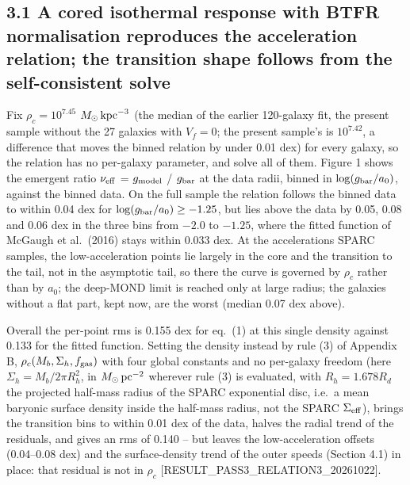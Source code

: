 \documentclass[
  10pt,
]{article}
\begin{document}
\subsection{3.1 A cored isothermal response with BTFR normalisation reproduces the acceleration relation; the transition shape follows from the self-consistent solve}\label{a-cored-isothermal-response-with-btfr-normalisation-reproduces-the-acceleration-relation-the-transition-shape-is-the-output}

Fix $\rho_c=10^{7.45}$ $M_\odot\,{\rm kpc}^{-3}$ (the median of the earlier 120-galaxy fit, the present sample without the 27 galaxies with $V_f=0$; the present sample's is $10^{7.42}$, a difference that moves the binned relation by under 0.01 dex) for every galaxy, so the relation has no per-galaxy parameter, and solve all of them. Figure 1 shows the emergent ratio $\nu_{\rm eff}$ = $g_{\rm model}$ / $g_{\rm bar}$ at the data radii, binned in $\log(g_{\rm bar}/a_0)$, against the binned data. On the full sample the relation follows the binned data to within 0.04 dex for $\log(g_{\rm bar}/a_0)\ge-1.25$, but lies above the data by 0.05, 0.08 and 0.06 dex in the three bins from $-2.0$ to $-1.25$, where the fitted function of McGaugh et al.~(2016) stays within 0.033 dex. At the accelerations SPARC samples, the low-acceleration points lie largely in the core and the transition to the tail, not in the asymptotic tail, so there the curve is governed by $\rho_c$ rather than by $a_0$; the deep-MOND limit is reached only at large radius; the galaxies without a flat part, kept now, are the worst (median 0.07 dex above).

Overall the per-point rms is 0.155 dex for eq.~(1) at this single density against 0.133 for the fitted function. Setting the density instead by rule (3) of Appendix B, $\rho_c(M_b,\Sigma_h,f_{\rm gas})$ with four global constants and no per-galaxy freedom (here $\Sigma_h=M_b/2\pi R_h^2$, in $M_\odot\,{\rm pc}^{-2}$ wherever rule (3) is evaluated, with $R_h=1.678R_d$ the projected half-mass radius of the SPARC exponential disc, i.e.\ a mean baryonic surface density inside the half-mass radius, not the SPARC $\Sigma_{\rm eff}$), brings the transition bins to within 0.01 dex of the data, halves the radial trend of the residuals, and gives an rms of 0.140 -- but leaves the low-acceleration offsets (0.04--0.08 dex) and the surface-density trend of the outer speeds (Section 4.1) in place: that residual is not in $\rho_c$ {[}RESULT\_PASS3\_RELATION3\_20261022{]}.
\end{document}
